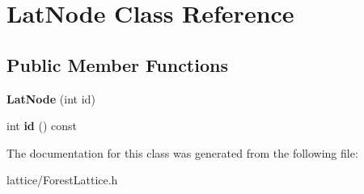 \hypertarget{classLatNode}{
\section{LatNode Class Reference}
\label{classLatNode}
}
\subsection*{Public Member Functions}
\begin{DoxyCompactItemize}
\item 
\hypertarget{classLatNode_a54504201745a3a516c9deb461bcccdaf}{
{\bfseries LatNode} (int id)}
\label{classLatNode_a54504201745a3a516c9deb461bcccdaf}

\item 
\hypertarget{classLatNode_a635ad6bb3aca93ac8e43736b5b8b74ec}{
int {\bfseries id} () const }
\label{classLatNode_a635ad6bb3aca93ac8e43736b5b8b74ec}

\end{DoxyCompactItemize}


The documentation for this class was generated from the following file:\begin{DoxyCompactItemize}
\item 
lattice/ForestLattice.h\end{DoxyCompactItemize}
